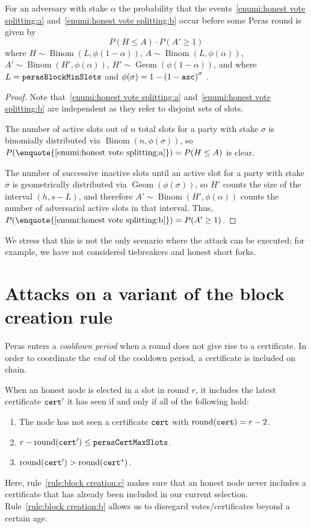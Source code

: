 \begin{lemma}
  For an adversary with stake $\alpha$ the probability that the events~\ref{enumi:honest vote splitting:a} and~\ref{enumi:honest vote splitting:b} occur before some Peras round is given by \[ P(H\le A) \cdot P(A' \ge 1) \]
  where $H\sim\operatorname{Binom}(L,\phi(1-\alpha))$, $A\sim\operatorname{Binom}(L,\phi(\alpha))$, $A' \sim \operatorname{Binom}(H',\phi(\alpha))$, $H' \sim \operatorname{Geom}(\phi(1-\alpha))$, and where $L= \mathtt{perasBlockMinSlots}$ and $\phi(\sigma) = 1-{(1-\mathtt{asc})}^\sigma$ \parencite[(1)]{david2018ouroboros}.
\end{lemma}
\begin{proof}
  Note that~\ref{enumi:honest vote splitting:a} and~\ref{enumi:honest vote splitting:b} are independent as they refer to disjoint sets of slots.

  The number of active slots out of $n$ total slots for a party with stake $\sigma$ is binomially distributed via $\operatorname{Binom}(n,\phi(\sigma))$, so $P(\enquote{\ref{enumi:honest vote splitting:a}}) = P(H\le A)$ is clear.

  The number of successive inactive slots until an active slot for a party with stake $\sigma$ is geometrically distributed via $\operatorname{Geom}(\phi(\sigma))$, so $H'$ counts the size of the interval $(h,s-L)$, and therefore $A' \sim \operatorname{Binom}(H',\phi(\alpha))$ counts the number of adversarial active slots in that interval.
  Thus, $P(\enquote{\ref{enumi:honest vote splitting:b}}) = P(A'\ge 1)$.
\end{proof}

\medskip
We stress that this is not the only scenario where the attack can be executed; for example, we have not considered tiebreakers and honest short forks.

\section{Attacks on a variant of the block creation rule}

Peras enters a \emph{cooldown period} when a round does not give rise to a certificate.
In order to coordinate the \emph{end} of the cooldown period, a certificate is included on chain.

When an honest node is elected in a slot in round $r$, it includes the latest certificate $\mathtt{cert}'$ it has seen if and only if all of the following hold:
\begin{enumerate}
\item\label{rule:block creation:a} The node has not seen a certificate $\mathtt{cert}$ with $\operatorname{round}(\mathtt{cert})=r-2$.
\item\label{rule:block creation:b} $r-\operatorname{round}(\mathtt{cert}') \le \mathtt{perasCertMaxSlots}$.
\item\label{rule:block creation:c} $\operatorname{round}(\mathtt{cert}') > \operatorname{round}(\mathtt{cert}^*)$.
\end{enumerate}
Here, rule~\ref{rule:block creation:c} makes sure that an honest node never includes a certificate that has already been included in our current selection.
Rule~\ref{rule:block creation:b} allows us to disregard votes/certificates beyond a certain age.

